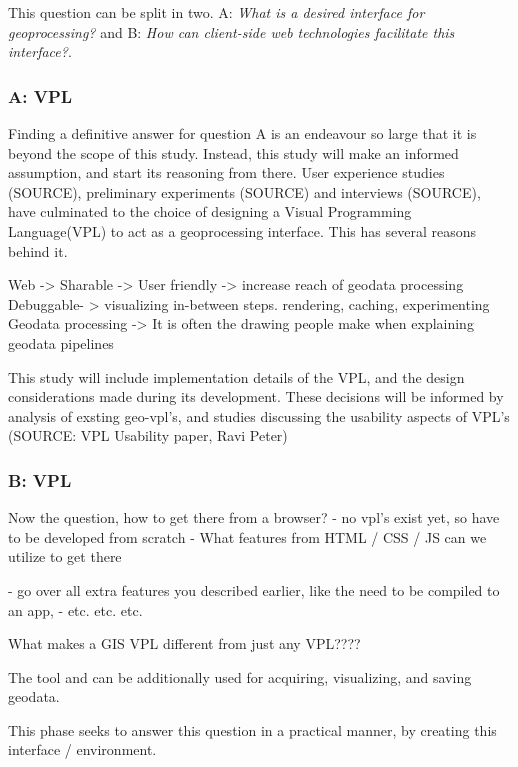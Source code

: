 This question can be split in two. A: \textit{What is a desired interface for geoprocessing?} and B:  \textit{How can client-side web technologies facilitate this interface?}. 

\subsubsection*{A: VPL}
Finding a definitive answer for question A is an endeavour so large that it is beyond the scope of this study. Instead, this study will make an informed assumption, and start its reasoning from there. 
User experience studies (SOURCE), preliminary experiments (SOURCE) and interviews (SOURCE), have culminated to the choice of designing a Visual Programming Language(VPL) to act as a geoprocessing interface. This has several reasons behind it.



Web -> Sharable -> User friendly -> increase reach of geodata processing
Debuggable- > visualizing in-between steps. rendering, caching, experimenting
Geodata processing -> It is often the drawing people make when explaining geodata pipelines

This study will include implementation details of the VPL, and the design considerations made during its development. These decisions will be informed by analysis of exsting geo-vpl's, and studies discussing the usability aspects of VPL's (SOURCE: VPL Usability paper,  Ravi Peter)


\subsubsection*{B: VPL}

Now the question, how to get there from a browser?
- no vpl's exist yet, so have to be developed from scratch
- What features from HTML / CSS / JS can we utilize to get there

- go over all extra features you described earlier, like the need to be compiled to an app, 
- etc. etc. etc.

What makes a GIS VPL different from just any VPL???? 

The tool and can be additionally used for acquiring, visualizing, and saving geodata.


This phase seeks to answer this question in a practical manner, by creating this interface / environment.



